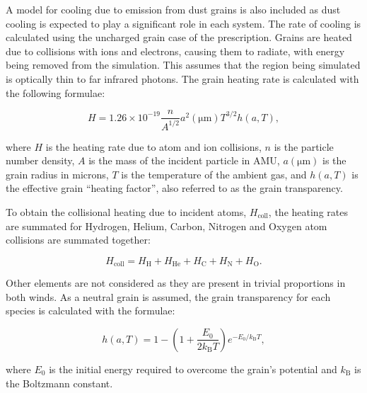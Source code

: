 \documentclass[fleqn,usenatbib]{mnras}
\begin{document}
A model for cooling due to emission from dust grains is also included as dust cooling is expected to play a significant role in each system.
The rate of cooling is calculated using the uncharged grain case of the \cite{dwek_infrared_1981} prescription.
Grains are heated due to collisions with ions and electrons, causing them to radiate, with energy being removed from the simulation.
This assumes that the region being simulated is optically thin to far infrared photons.
The grain heating rate is calculated with the following formulae:

\begin{equation}
    H = 1.26 \times 10^{-19} \frac{n}{A^{1/2}} a^2(\si{\micro\metre}) T^{3/2} h(a,T) , 
\end{equation}

\noindent
where $H$ is the heating rate due to atom and ion collisions, 
$n$ is the particle number density,
$A$ is the mass of the incident particle in AMU,
$a(\si{\micro\metre})$ is the grain radius in microns,
$T$ is the temperature of the ambient gas,
and $h(a,T)$ is the effective grain ``heating factor'', also referred to as the grain transparency. 

To obtain the collisional heating due to incident atoms, $H_\text{coll}$, the heating rates are summated for Hydrogen, Helium, Carbon, Nitrogen and Oxygen atom collisions are summated together:

\begin{equation}
  H_\text{coll} = H_\text{H} + H_\text{He} + H_\text{C} + H_\text{N} + H_\text{O} .
\end{equation}

\noindent
Other elements are not considered as they are present in trivial proportions in both winds.
As a neutral grain is assumed, the grain transparency for each species is calculated with the formulae:

\begin{equation}
  h(a,T) = 1 - \left( 1 + \frac{E_0}{2 k_\text{B} T} \right) e^{- E_0 / k_\text{B} T} ,
\end{equation}

\noindent
where $E_0$ is the initial energy required to overcome the grain's potential and $k_\text{B}$ is the Boltzmann constant.
\end{document}
